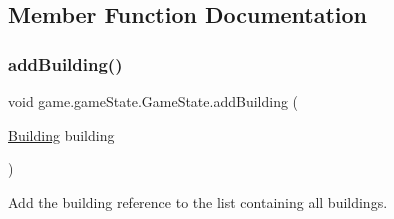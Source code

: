 \subsection{Member Function Documentation}
\mbox{\label{classgame_1_1game_state_1_1_game_state_a1062a7a5164975ed330180b3ba47c7b2}} 
\subsubsection{\texorpdfstring{add\+Building()}{addBuilding()}}
{\footnotesize\ttfamily void game.\+game\+State.\+Game\+State.\+add\+Building (\begin{DoxyParamCaption}\item[{\mbox{\hyperlink{classgame_1_1board_1_1_building}{Building}}}]{building }\end{DoxyParamCaption})\hspace{0.3cm}{\ttfamily [inline]}}

Add the building reference to the list containing all buildings.


